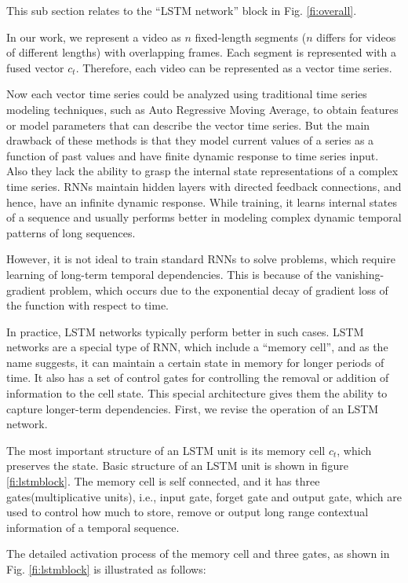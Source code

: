 This sub section relates to
the ``LSTM network'' block in Fig. \ref{fi:overall}.

In our work, we represent a video as $n$
fixed-length segments ($n$ differs for videos of different lengths) with overlapping frames.  Each segment
is represented with a fused vector $c_{t}$. Therefore, each video can be represented as a vector time series.


Now each vector time series could be analyzed using traditional time series modeling techniques,
such as Auto Regressive Moving Average, to obtain features or model parameters that can describe the
vector time series.
But the main drawback of these methods is that they model current values of a series as a function of past values
and have finite dynamic response to time series input. Also they lack the ability to grasp the internal state
representations of a complex time series. RNNs maintain hidden layers with directed feedback connections, and hence,
have an infinite dynamic response. While training, it learns internal states of a sequence
and usually performs better in modeling complex dynamic temporal patterns of long sequences.


However, it is not ideal to train standard RNNs to solve problems,
which require learning of long-term temporal dependencies. This is because of the vanishing-gradient problem, which occurs
due to the exponential decay of gradient loss of the function with respect to time.

In practice, LSTM networks typically perform better in such cases.
LSTM networks are a special type of RNN, which include a ``memory cell'', and as the name suggests,
it can maintain a certain state in memory for longer periods of time.
It also has a set of control gates for controlling the removal or addition of information to the cell state.
This special architecture gives them the ability to capture longer-term dependencies. First, we revise the operation of an LSTM network.

The most important structure of an LSTM unit is its memory cell $c_{t}$, which preserves the state. Basic structure of an LSTM unit is shown in figure \ref{fi:lstmblock}. The memory cell is self connected, and it has three gates(multiplicative units), i.e., input gate, forget gate and
output gate, which are used to control how much to store, remove or output long range contextual information of a temporal sequence.

The detailed activation process of the memory cell and three gates, as shown in Fig. \ref{fi:lstmblock} is
illustrated as follows:


